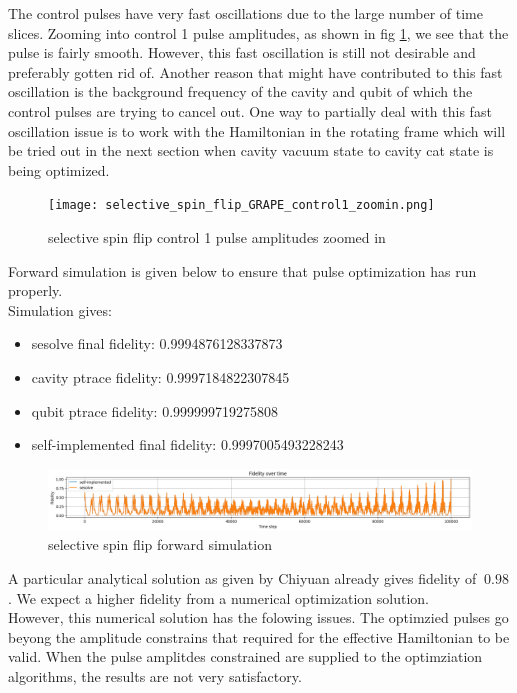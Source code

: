 \documentclass{article}
\begin{document}
The control pulses have very fast oscillations due to the large number of time slices.
Zooming into control 1 pulse amplitudes, as shown in fig \ref{fig:selective_spin_flip_control3_zoomin},
we see that the pulse is fairly smooth. However, this fast oscillation is still not desirable and preferably gotten rid of. 
Another reason that might have contributed to this fast oscillation is the background frequency of the cavity and qubit 
of which the control pulses are trying to cancel out. One way to partially deal with this fast oscillation issue is to work
with the Hamiltonian in the rotating frame which will be tried out in the next section when cavity vacuum state to cavity cat state
is being optimized. 

\begin{figure}[H]
    \centering
    \texttt{[image: selective\_spin\_flip\_GRAPE\_control1\_zoomin.png]}
    \caption{selective spin flip control 1 pulse amplitudes zoomed in}
    \label{fig:selective_spin_flip_control3_zoomin}
\end{figure}

Forward simulation is given below to ensure that pulse optimization has run properly. 
\\
Simulation gives: 
\begin{itemize}
    \item sesolve final fidelity:  0.9994876128337873
    \item cavity ptrace fidelity:  0.9997184822307845
    \item qubit ptrace fidelity:  0.999999719275808
    \item self-implemented final fidelity:  0.9997005493228243
\end{itemize}
\begin{figure}[H]
    \centering
    \includegraphics[width=0.6\linewidth]{selective_spin_flip_GRAPE_simulation.png}
    \caption{selective spin flip forward simulation}
    \label{fig:selective_spin_flip_forward_simulation}
\end{figure}


A particular analytical solution as given by Chiyuan already gives fidelity of $~0.98$.
            We expect a higher fidelity from a numerical optimization solution. 
\\
However, this numerical solution has the folowing issues.
The optimzied pulses go beyong the amplitude constrains that required for the effective Hamiltonian to be valid. 
When the pulse amplitdes constrained are supplied to the optimziation algorithms, the results are not very satisfactory. 
\end{document}
